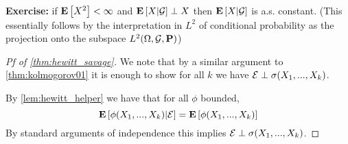 \documentclass{article}
\begin{document}
\textbf{Exercise:} if ${\mathbf E}\left[X^2\right]<\infty$ and ${\mathbf E}\left[X|\mathcal G\right]\perp X$ then ${\mathbf E}\left[X|\mathcal G\right]$ is a.s. constant. (This essentially follows by the interpretation in $L^2$ of conditional probability as the projection onto the subspace $L^2(\Omega,\mathcal G,\mathbf{P})$)

\begin{proof}[Pf of \ref{thm:hewitt_savage}]
    We note that by a similar argument to \ref{thm:kolmogorov01} it is enough to show for all $k$ we have $\mathcal E\perp\sigma(X_1,...,X_k)$.

    By \ref{lem:hewitt_helper} we have that for all $\phi$ bounded,
    \begin{equation*}
        {\mathbf E}\left[\phi(X_1,...,X_k)|\mathcal E\right]={\mathbf E}\left[\phi(X_1,...,X_k)\right]
    \end{equation*}
    By standard arguments of independence this implies $\mathcal E\perp\sigma(X_1,...,X_k)$.
\end{proof}
\end{document}
